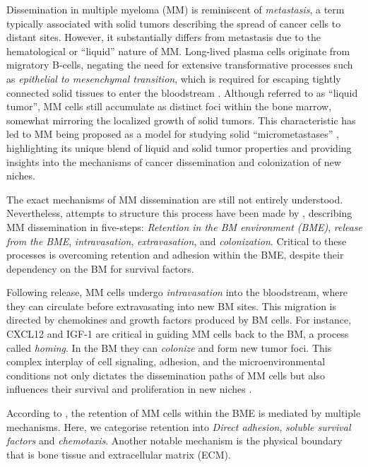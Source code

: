 Dissemination in multiple myeloma (MM) is reminiscent of \emph{metastasis}, a
term typically associated with solid tumors describing the spread of cancer
cells to distant sites. However, it substantially differs from metastasis due to
the hematological or ``liquid'' nature of MM. Long-lived plasma cells originate
from migratory B-cells, negating the need for extensive transformative processes
such as \emph{epithelial to mesenchymal transition}, which is required for
escaping tightly connected solid tissues to enter the bloodstream
\cite{ribattiEpithelialMesenchymalTransitionCancer2020}. Although referred to as
``liquid tumor'', MM cells still accumulate as distinct foci within the bone
marrow, somewhat mirroring the localized growth of solid tumors. This
characteristic has led to MM being proposed as a model for studying solid
``micrometastases'' \cite{ghobrialMyelomaModelProcess2012}, highlighting its
unique blend of liquid and solid tumor properties and providing insights into
the mechanisms of cancer dissemination and colonization of new niches.

The exact mechanisms of MM dissemination are still not entirely understood.
Nevertheless, attempts to structure this process have been made by
\citet{zeissigTumourDisseminationMultiple2020}, describing MM dissemination in
five-steps: \emph{Retention in the BM environment (BME)}, \emph{release from the
BME}, \emph{intravasation}, \emph{extravasation}, and \emph{colonization}.
Critical to these processes is overcoming retention and
adhesion within the BME, despite their dependency on the BM for survival
factors. 

Following release, MM cells undergo \emph{intravasation} into the bloodstream,
where they can circulate before extravasating into new BM sites. This migration
is directed by chemokines and growth factors produced by BM cells. For instance,
CXCL12 and IGF-1 are critical in guiding MM cells back to the BM, a process
called \emph{homing}. In the BM they can \emph{colonize} and form new tumor
foci. This complex interplay of cell signaling, adhesion, and the
microenvironmental conditions not only dictates the dissemination paths of MM
cells but also influences their survival and proliferation in new niches
\cite{zeissigTumourDisseminationMultiple2020}.


%
\label{sec:intro_myeloma_retention}%
According to \citet{zeissigTumourDisseminationMultiple2020}, the retention
of MM cells within the BME is mediated by multiple mechanisms. Here, we
categorise retention into \emph{Direct adhesion}, \emph{soluble survival
factors} and \emph{chemotaxis}. Another notable mechanism is the physical
boundary that is bone tissue and extracellular matrix (ECM).

